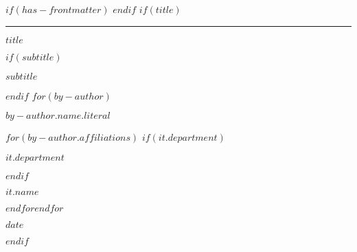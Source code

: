 $if(has-frontmatter)$
\frontmatter
$endif$
$if(title)$
\cleardoublepage
\thispagestyle{empty}
{\centering
\hrule
\hbox{}\vspace{25ex}
{\Huge\bfseries $title$ \par}
$if(subtitle)$
\vspace{3ex}
{\Large\bfseries $subtitle$ \par}
$endif$
\vspace{12ex}
$for(by-author)$
{\Large\bfseries $by-author.name.literal$ \par}
\vspace{3ex}
$for(by-author.affiliations)$%
$if(it.department)$%
{\bfseries\large $it.department$ \par}
\vspace{3ex}
$endif$%
{\bfseries\large $it.name$ \par}
$endfor$$endfor$%
\vspace{5ex}
{\bfseries\large $date$ \par}
\vspace{13ex}
}
$endif$